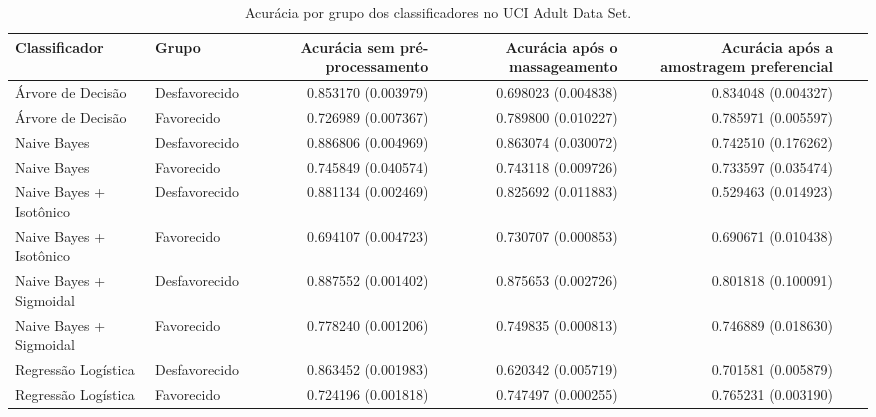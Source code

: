 \begin{table}
    \centering
    \caption{Acurácia por grupo dos classificadores no UCI Adult Data Set.}
    \label{table:grupoAdultCompleto}
    \begin{tabular}{llrrrrr}
    \toprule
    Classificador           &  Grupo        &  Acurácia sem pré-processamento    &  Acurácia após o massageamento  &  Acurácia após a amostragem preferencial  \\    
    \midrule
    Árvore de Decisão       &  Desfavorecido &  0.853170       (0.003979)       &     0.698023 (0.004838)       &  0.834048  (0.004327)  \\
    Árvore de Decisão       &     Favorecido &   0.726989    (0.007367)          &  0.789800   (0.010227)           & 0.785971 (0.005597)       \\    
    Naive Bayes              &  Desfavorecido &   0.886806     (0.004969)         &   0.863074 (0.030072)        & 0.742510 (0.176262)   \\
    Naive Bayes              &     Favorecido &    0.745849 (0.040574)           & 0.743118    (0.009726)         & 0.733597 (0.035474)   \\
    Naive Bayes + Isotônico   &  Desfavorecido &   0.881134 (0.002469)           &  0.825692 (0.011883)            &   0.529463 (0.014923)   \\
    Naive Bayes + Isotônico   &     Favorecido &    0.694107 (0.004723)           &  0.730707 (0.000853)            & 0.690671 (0.010438)    \\
    Naive Bayes + Sigmoidal    &  Desfavorecido &    0.887552 (0.001402)          &  0.875653 (0.002726)            & 0.801818 (0.100091)    \\
    Naive Bayes + Sigmoidal    &     Favorecido &     0.778240 (0.001206)        &  0.749835  (0.000813)           &  0.746889 (0.018630)     \\
    Regressão Logística        &  Desfavorecido &    0.863452 (0.001983)       &   0.620342 (0.005719)           &  0.701581 (0.005879)     \\
    Regressão Logística        &     Favorecido &  0.724196 (0.001818)         &  0.747497  (0.000255)             & 0.765231 (0.003190)      \\
    \bottomrule
    \end{tabular}
    \end{table}